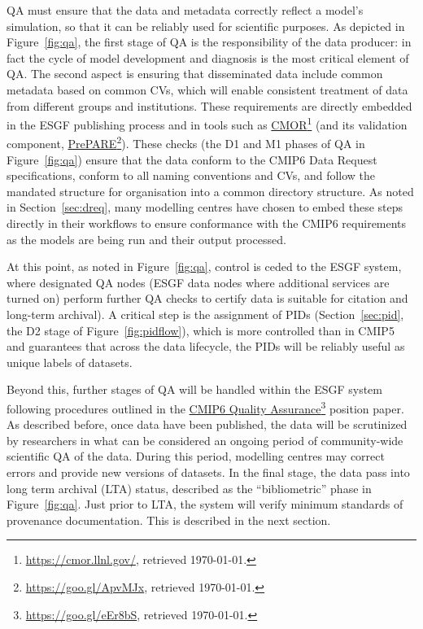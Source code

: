 \documentclass[gmd,manuscript]{copernicus}
\newcommand{\urlref}[2] {\href{#1}{#2}\footnote{\url{#1}, retrieved \today.}}
\begin{document}
QA must ensure that the data and metadata correctly reflect a model's
simulation, so that it can be reliably used for scientific purposes.
As depicted in Figure~\ref{fig:qa}, the first stage of QA is the
responsibility of the data producer: in fact the cycle of model
development and diagnosis is the most critical element of QA. The
second aspect is ensuring that disseminated data include common
metadata based on common CVs, which will enable consistent treatment
of data from different groups and institutions. These requirements are
directly embedded in the ESGF publishing process and in tools such as
\urlref{https://cmor.llnl.gov/}{CMOR} (and its validation component,
\urlref{https://goo.gl/ApvMJx}{PrePARE}). These checks (the D1 and M1
phases of QA in Figure~\ref{fig:qa}) ensure that the data conform to
the CMIP6 Data Request specifications, conform to all naming
conventions and CVs, and follow the mandated structure for
organisation into a common directory structure. As noted in
Section~\ref{sec:dreq}, many modelling centres have chosen to embed
these steps directly in their workflows to ensure conformance with the
CMIP6 requirements as the models are being run and their output processed.

At this point, as noted in Figure~\ref{fig:qa}, control is ceded to
the ESGF system, where designated QA nodes 
(ESGF data nodes where additional services are turned on) 
perform further QA checks to certify data is suitable 
 for citation and long-term archival). 
 A critical step is the assignment of PIDs
(Section~\ref{sec:pid}, the D2 stage of Figure~\ref{fig:pidflow}),
which is more controlled than in CMIP5 and guarantees that across the
data lifecycle, the PIDs will be reliably useful as unique labels of
datasets.

Beyond this, further stages of QA will be handled within the ESGF
system following procedures outlined in the
\urlref{https://goo.gl/eEr8bS}{CMIP6 Quality Assurance} position
paper. As described before, once data have been published, the data
will be scrutinized by researchers in what can be considered an
ongoing period of community-wide scientific QA of the data. During
this period, modelling centres may correct errors and provide new
versions of datasets. In the final stage, the data pass into long term
archival (LTA) status, described as the ``bibliometric'' phase in
Figure~\ref{fig:qa}. Just prior to LTA, the system will verify minimum
standards of provenance documentation. This is described in the next
section.
\end{document}
